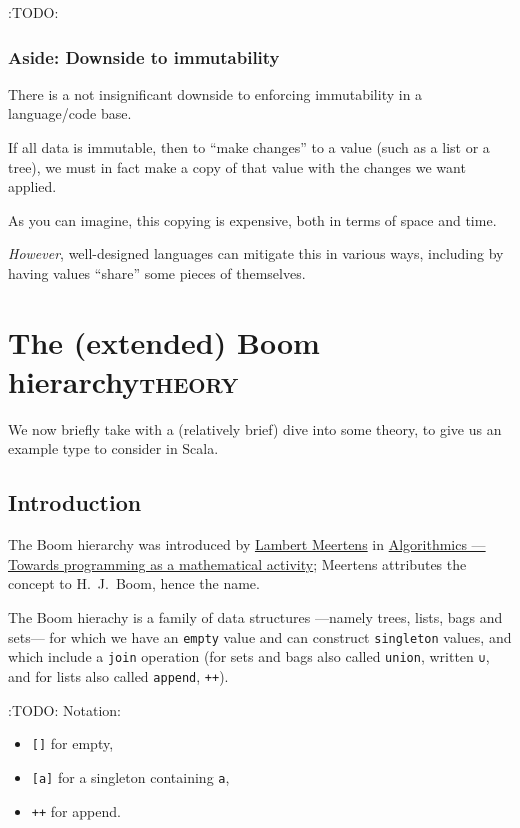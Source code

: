 \documentclass[11pt]{article}
\begin{document}
:TODO:

\subsubsection{Aside: Downside to immutability}
\label{sec:org456ed64}

There is a not insignificant downside to enforcing immutability
in a language/code base.

If all data is immutable, then to “make changes” to a value
(such as a list or a tree),
we must in fact make a copy of that value
with the changes we want applied.

As you can imagine, this copying is expensive,
both in terms of space and time.

\emph{However}, well-designed languages can mitigate this
in various ways, including by having values “share”
some pieces of themselves.

\section{The (extended) Boom hierarchy\hfill{}\textsc{theory}}
\label{sec:orged9e269}
We now briefly take with a (relatively brief) dive into some theory,
to give us an example type to consider in Scala.

\subsection{Introduction}
\label{sec:org56f8a0c}
The Boom hierarchy was introduced
by \href{https://www.kestrel.edu/people/meertens/publications/}{Lambert Meertens} in
\href{https://www.kestrel.edu/people/meertens/publications/papers/Algorithmics.pdf}{Algorithmics — Towards programming as a mathematical activity};
Meertens attributes the concept to H. J. Boom, hence the name.

The Boom hierachy is a family of data structures
—namely trees, lists, bags and sets—
for which we have an \texttt{empty} value and can construct \texttt{singleton} values,
and which include a \texttt{join} operation
(for sets and bags also called \texttt{union}, written \texttt{∪},
and for lists also called \texttt{append}, \texttt{++}).

:TODO:
Notation:
\begin{itemize}
\item \texttt{[]} for empty,
\item \texttt{[a]} for a singleton containing \texttt{a},
\item \texttt{++} for append.
\end{itemize}
\end{document}
